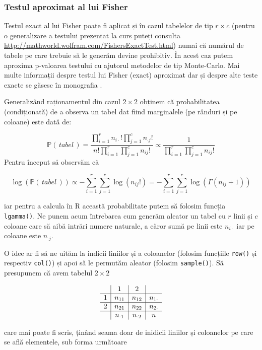 \documentclass[]{article}
\begin{document}
\subsubsection{Testul aproximat al lui
Fisher}\label{testul-aproximat-al-lui-fisher}

Testul exact al lui Fisher poate fi aplicat și în cazul tabelelor de tip
\(r\times c\) (pentru o generalizare a testului prezentat la curs puteți
consulta \url{http://mathworld.wolfram.com/FishersExactTest.html}) numai
că numărul de tabele pe care trebuie să le generăm devine prohibitiv. În
acest caz putem aproxima p-valoarea testului cu ajutorul metodelor de
tip Monte-Carlo. Mai multe informații despre testul lui Fisher (exact)
aproximat dar și despre alte teste exacte se găsesc în monografia
\citep{Mehta1995}.

Generalizând raționamentul din cazul \(2 \times 2\) obținem că
probabilitatea (condiționată) de a observa un tabel dat fiind
marginalele (pe rânduri și pe coloane) este dată de:

\[
  \mathbb{P}(\,tabel\,) = \frac{\prod_{i=1}^{r}n_{i\cdot}!\prod_{j=1}^{c}n_{\cdot j}!}{n!\prod_{i=1}^{r}\prod_{j=1}^{c}n_{ij}!}\propto\frac{1}{\prod_{i=1}^{r}\prod_{j=1}^{c}n_{ij}!}
\] Pentru început să observăm că

\[
  \log(\mathbb{P}(\,tabel\,))\propto - \sum_{i=1}^{r}\sum_{j=1}^{c}\log(n_{ij}!) = - \sum_{i=1}^{r}\sum_{j=1}^{c}\log(\Gamma(n_{ij} + 1))
\]

iar pentru a calcula în R această probabilitate putem să folosim funcția
\texttt{lgamma()}. Ne punem acum întrebarea cum generăm aleator un tabel
cu \(r\) linii și \(c\) coloane care să aibă intrări numere naturale, a
căror sumă pe linii este \(n_{i\cdot}\) iar pe coloane este
\(n_{\cdot j}\).

O idee ar fi să ne uităm la indicii liniilor și a coloanelor (folosim
funcțiile \texttt{row()} și respectiv \texttt{col()}) și apoi să le
permutăm aleator (folosim \texttt{sample()}). Să presupunem că avem
tabelul \(2\times 2\)

\[
  \begin{array}{c|c|c|c}
     & 1 & 2 &\\
    \hline
    1 & n_{11} & n_{12} & n_{1\cdot}\\
    \hline
    2 & n_{21} & n_{22} & n_{2\cdot}\\
    \hline
     & n_{\cdot 1} & n_{\cdot 2} & n 
  \end{array}
\]

care mai poate fi scris, ținând seama doar de inidicii liniilor și
coloanelor pe care se află elementele, sub forma următoare
\end{document}
